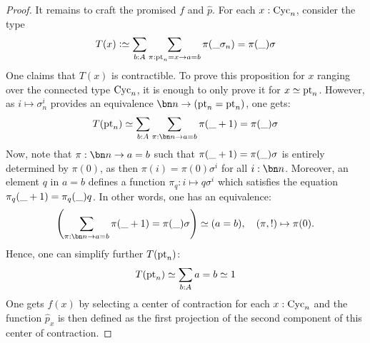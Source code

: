 \begin{proof}
  It remains to craft the promised $f$ and $\hat p$. For each $x:\mathrm{Cyc}_n$, consider the type
  \begin{displaymath}
    T(x) \defequi \sum_{b:A}\sum_{\pi: \pt_n = x \to a = b} \pi(\blank\sigma_n) = \pi(\blank) \sigma
  \end{displaymath}
  One claims that $T(x)$ is contractible. To prove this proposition for $x$
  ranging over the connected type $\mathrm{Cyc}_n$, it is enough to only prove it for
  $x \jdeq \pt_n$. However, as $i \mapsto \sigma_n^i$ provides an equivalence
  $\bn n \to (\pt_n = \pt_n)$, one gets:
  \begin{displaymath}
    T(\pt_n) \weq \sum_{b:A}\sum_{\pi: \bn n \to a = b} \pi(\blank + 1) = \pi(\blank)\sigma
  \end{displaymath}
  Now, note that $\pi:\bn n \to a=b$ such that $\pi(\_ +1) = \pi(\_)
  \sigma$ is entirely determined by $\pi(0)$, as then $\pi(i) = \pi(0)\sigma^i$
  for all $i:\bn n$. Moreover, an element $q$ in $a=b$ defines a function
  $\pi_q:i \mapsto q\sigma^i$ which satisfies the equation $\pi_q( \_ +1) =
  \pi_q(\_)q$. In other words, one has an equivalence:
  \begin{displaymath}
    \left( \sum_{\pi:\bn n \to a=b} \pi(\blank +1) = \pi(\blank )\sigma \right)
    \weq
    (a = b), \quad
    (\pi, !) \mapsto \pi(0).
  \end{displaymath}
  Hence, one can simplify further $T(\mathrm{pt}_n)$:
  \begin{displaymath}
    T(\mathrm{pt}_n) \simeq \sum_{b:A} a = b \simeq 1
  \end{displaymath}
  One gets $f(x)$ by selecting a center of contraction for each $x:\mathrm{Cyc}_n$ and
  the function $\hat p_x$ is then defined as the first projection of the second
  component of this center of contraction.



\end{proof}

